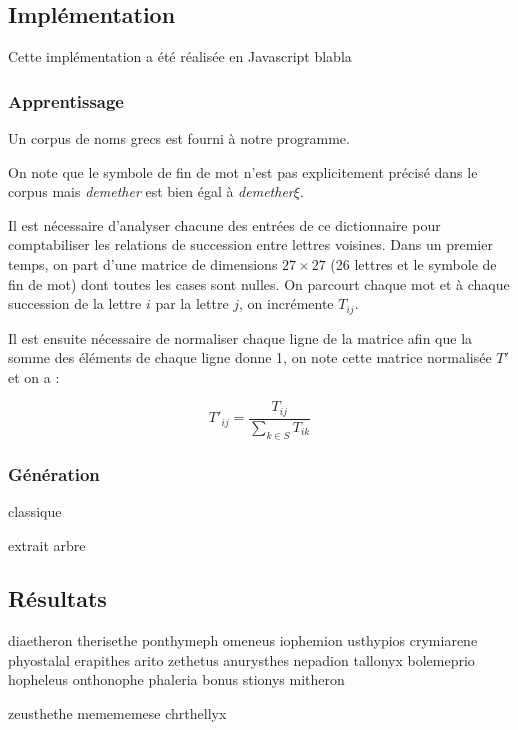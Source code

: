 \documentclass[12pt]{article}
\begin{document}
\subsection{Implémentation}

Cette implémentation a été réalisée en Javascript blabla

\subsubsection{Apprentissage}

Un corpus de noms grecs est fourni à notre programme.



On note que le symbole de fin de mot n'est pas explicitement précisé
dans le corpus mais \textit{demether} est bien égal à
\textit{demether}$\xi$.

Il est nécessaire d'analyser chacune des entrées de ce dictionnaire
pour comptabiliser les relations de succession entre lettres
voisines. Dans un premier temps, on part d'une matrice de dimensions
$27 \times 27$ (26 lettres et le symbole de fin de mot) dont toutes
les cases sont nulles. On parcourt chaque mot et à chaque succession
de la lettre $i$ par la lettre $j$, on incrémente $T_{ij}$.

Il est ensuite nécessaire de normaliser chaque ligne de la matrice
afin que la somme des éléments de chaque ligne donne 1, on note cette
matrice normalisée $T'$ et on a :

$$
{T'}_{ij} = \frac{T_{ij}}{\sum_{k \in S} T_{ik}}
$$

\subsubsection{Génération}

classique

extrait arbre

\subsection{Résultats}

diaetheron
therisethe
ponthymeph
omeneus
iophemion
usthypios
crymiarene
phyostalal
erapithes
arito
zethetus
anurysthes
nepadion
tallonyx
bolemeprio
hopheleus
onthonophe
phaleria
bonus
stionys
mitheron

zeusthethe
memememese
chrthellyx



\end{document}
